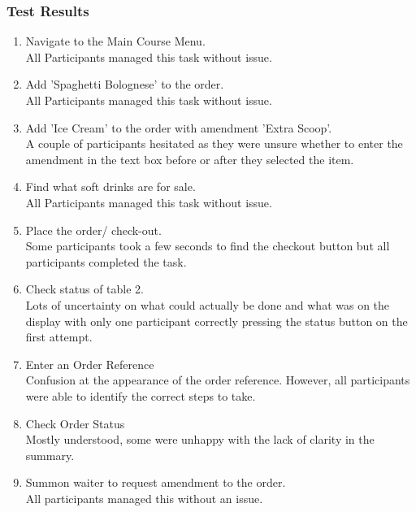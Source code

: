 \documentclass[11pt, a4paper]{report}
\begin{document}
\subsubsection{Test Results} 
\begin{enumerate} 
\item Navigate to the Main Course Menu. \\
All Participants managed this task without issue.
\item Add 'Spaghetti Bolognese' to the order. \\ 
All Participants managed this task without issue.
\item Add 'Ice Cream' to the order with amendment 'Extra Scoop'. \\ 
A couple of participants hesitated as they were unsure whether to enter the amendment in the text box before or after they selected the item.
\item Find what soft drinks are for sale.\\
All Participants managed this task without issue.
\item Place the order/ check-out.\\ 
Some participants took a few seconds to find the checkout button but all participants completed the task.
\item Check status of table 2.\\
Lots of uncertainty on what could actually be done and what was on the display with only one participant correctly pressing the status button on the first attempt.
\item Enter an Order Reference \\
Confusion at the appearance of the order reference. However, all participants were able to identify the correct steps to take.
\item Check Order Status \\
Mostly understood, some were unhappy with the lack of clarity in the summary.
\item Summon waiter to request amendment to the order.\\
All participants managed this without an issue. 
\end{enumerate} 
\end{document}
